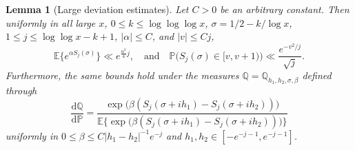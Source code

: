 \documentclass[10pt,a4paper]{amsart}
\newtheorem{lemma}{Lemma}
\begin{document}
\begin{lemma}[Large deviation estimates]\label{lem:LDestimates} Let $C>0$ be an arbitrary constant. Then uniformly in all large $x$, $0\leq k\leq \log\log\log x$, $\sigma=1/2-k/\log x$, $1\leq j\leq \log\log x-k+1$, $|\alpha|\leq C$, and ${|v|\leq Cj}$,
\begin{equation}\label{eq:density}
        \mathbb{E}\big\{e^{\alpha S_j(\sigma)}\big\}\ll e^{\frac{\alpha^2}{4}j},\quad \mathrm{and} \quad \mathbb{P}\big(S_{j}(\sigma)\in [v,v+1)\big) \ll \frac{e^{-v^2/j}}{\sqrt{j}}.
\end{equation}
Furthermore, the same bounds hold under the measures $\mathbb{Q}=\mathbb{Q}_{h_1,h_2,\sigma,\beta}$ defined through
\[
    \frac{\mathrm{d}\mathbb{Q}}{\mathrm{d}\mathbb{P}}=\frac{\exp\big(\beta(S_j(\sigma+ih_1)-S_j(\sigma+ih_2))\big)}{\mathbb{E}\big\{\!\exp\big(\beta(S_j(\sigma+ih_1)-S_j(\sigma+ih_2))\big)\!\big\}}
\]
uniformly in $0\leq \beta\leq C|h_1-h_2|^{-1}e^{-j}$ and $h_1,h_2\in [-e^{-j-1},e^{-j-1}]$.
\end{lemma}
\end{document}
